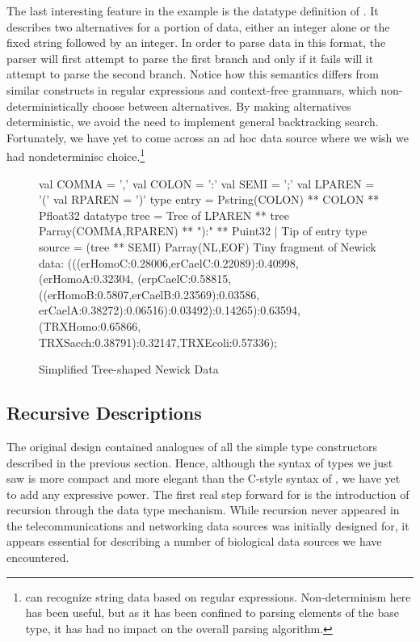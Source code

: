 The last interesting feature in the \dibbler{} example is the
datatype definition of .  It describes
two alternatives for a portion of data, either an integer alone
or the fixed string  followed by an integer.
In order to parse data in this format, the parser will
first attempt to parse the first branch and only if it
fails will it attempt to parse the second branch.
Notice how this semantics differs from similar constructs in
regular expressions and context-free grammars, which
non-deterministically choose between alternatives.
By making alternatives deterministic, we avoid
the need to implement general backtracking search.  
Fortunately, we have yet to come across an ad hoc data source
where we wish we had nondeterminisc choice.\footnote{\pads{}
can recognize string data based on regular expressions.
Non-determinism here has been useful, but as it
has been confined to parsing elements of the  
base type, it has had no impact on the overall parsing 
algorithm.}

\begin{figure}
\begin{code}
val COMMA  = ','
val COLON  = ':'
val SEMI   = ';'
val LPAREN = '('
val RPAREN = ')'
\mbox{}
type entry = Pstring(COLON) ** COLON ** Pfloat32
\mbox{}
datatype tree =
    Tree of LPAREN ** tree Parray(COMMA,RPAREN) ** "):" ** Puint32
  | Tip of entry
\mbox{}
type source = (tree ** SEMI) Parray(NL,EOF)
\mbox{}
{\rm Tiny fragment of Newick data:} 
\mbox{}
(((erHomoC:0.28006,erCaelC:0.22089):0.40998,(erHomoA:0.32304,
(erpCaelC:0.58815,((erHomoB:0.5807,erCaelB:0.23569):0.03586,
erCaelA:0.38272):0.06516):0.03492):0.14265):0.63594,(TRXHomo:0.65866,
TRXSacch:0.38791):0.32147,TRXEcoli:0.57336);
\end{code}
\caption{Simplified Tree-shaped Newick Data}
\label{fig:newick}
\end{figure}

\subsection{Recursive Descriptions}

The original \pads{} design contained analogues of all the 
simple type constructors described in the previous section.
Hence, although the syntax of types we just saw
is more compact and more elegant than the C-style syntax 
of \pads, we have yet to add any expressive power. 
The first real step forward for \datatype{} is the introduction
of recursion through the data type mechanism.  While
recursion never appeared in the telecommunications and 
networking data sources \pads{} was initially designed for, it
appears essential for describing a number of biological
data sources we have encountered.
  

